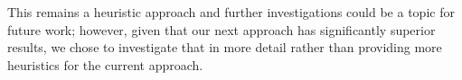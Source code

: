 This remains a heuristic approach and further investigations could be a topic for future work; however, given that our next approach has significantly superior results, we chose to investigate that in more detail rather than providing more heuristics for the current approach.

% 





